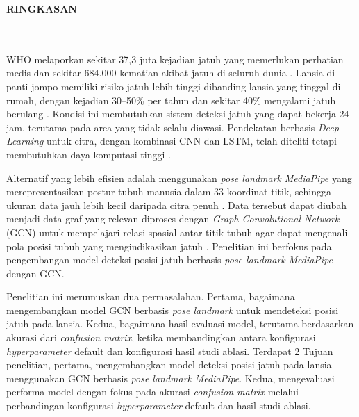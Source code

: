 \clearpage
{}%
\thispagestyle{fancy}

\begin{center}
	\large \bfseries \MakeUppercase{Ringkasan}\\
	\normalsize \normalfont {\thetitle}\\
	\normalsize \normalfont {\theauthor}\\
	\bigskip
	
	\normalsize \normalfont \justifying
\normalsize \normalfont \justifying

WHO melaporkan sekitar 37,3 juta kejadian jatuh yang memerlukan perhatian medis dan sekitar 684.000 kematian akibat jatuh di seluruh dunia \cite{Who2021}. Lansia di panti jompo memiliki risiko jatuh lebih tinggi dibanding lansia yang tinggal di rumah, dengan kejadian 30--50\% per tahun dan sekitar 40\% mengalami jatuh berulang \cite{ACEBAC2023}. Kondisi ini membutuhkan sistem deteksi jatuh yang dapat bekerja 24 jam, terutama pada area yang tidak selalu diawasi. Pendekatan berbasis \textit{Deep Learning} untuk citra, dengan kombinasi CNN dan LSTM, telah diteliti tetapi membutuhkan daya komputasi tinggi \cite{Chhetri2021}. 

Alternatif yang lebih efisien adalah menggunakan \textit{pose landmark} \textit{MediaPipe} yang merepresentasikan postur tubuh manusia dalam 33 koordinat titik, sehingga ukuran data jauh lebih kecil daripada citra penuh \cite{Lugaresi2019}. Data tersebut dapat diubah menjadi data graf yang relevan diproses dengan \textit{Graph Convolutional Network} (GCN) untuk mempelajari relasi spasial antar titik tubuh agar dapat mengenali pola posisi tubuh yang mengindikasikan jatuh \cite{Zahan2025}. Penelitian ini berfokus pada pengembangan model deteksi posisi jatuh berbasis \textit{pose landmark} \textit{MediaPipe} dengan GCN. \par

Penelitian ini merumuskan dua permasalahan. Pertama, bagaimana mengembangkan model GCN berbasis \textit{pose landmark} untuk mendeteksi posisi jatuh pada lansia. Kedua, bagaimana hasil evaluasi model, terutama berdasarkan akurasi dari \textit{confusion matrix}, ketika membandingkan antara konfigurasi \textit{hyperparameter} default dan konfigurasi hasil studi ablasi. Terdapat 2 Tujuan penelitian, pertama, mengembangkan model deteksi posisi jatuh pada lansia menggunakan GCN berbasis \textit{pose landmark} \textit{MediaPipe}. Kedua, mengevaluasi performa model dengan fokus pada akurasi \textit{confusion matrix} melalui perbandingan konfigurasi \textit{hyperparameter} default dan hasil studi ablasi. \par


\end{center}
